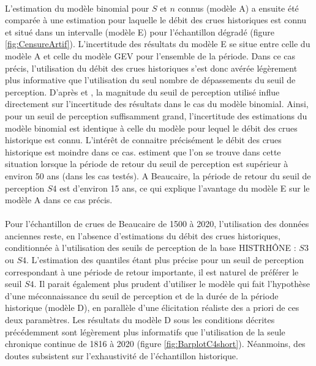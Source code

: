 	\paragraph{} L'estimation du modèle binomial pour $S$ et $n$ connus (modèle A) a ensuite été comparée à une estimation pour laquelle le débit des crues historiques est connu et situé dans un intervalle (modèle E) pour l'échantillon dégradé (figure \ref{fig:CensureArtif}). L'incertitude des résultats du modèle E se situe entre celle du modèle A et celle du modèle GEV pour l'ensemble de la période. Dans ce cas précis, l'utilisation du débit des crues historiques s'est donc avérée légèrement plus informative que l'utilisation du seul nombre de dépassements du seuil de perception. D'après \citet{stedinger_flood_1986} et \citet{payrastre_usefulness_2011}, la magnitude du seuil de perception utilisé influe directement sur l'incertitude des résultats dans le cas du modèle binomial. Ainsi, pour un seuil de perception suffisamment grand, l'incertitude des estimations du modèle binomial est identique à celle du modèle pour lequel le débit des crues historique est connu. L'intérêt de connaitre précisément le débit des crues historique est moindre dans ce cas. \citet{payrastre_usefulness_2011} estiment que l'on se trouve dans cette situation lorsque la période de retour du seuil de perception est supérieur à environ 50 ans (dans les cas testés). A Beaucaire, la période de retour du seuil de perception $S4$ est d'environ 15 ans, ce qui explique l'avantage du modèle E sur le modèle A dans ce cas précis.
	
		\paragraph{} Pour l'échantillon de crues de Beaucaire de 1500 à 2020, l'utilisation des données anciennes reste, en l'absence d'estimations du débit des crues historiques, conditionnée à l'utilisation des seuils de perception de la base HISTRHÔNE : $S3$ ou $S4$. L'estimation des quantiles étant plus précise pour un seuil de perception correspondant à une période de retour importante, il est naturel de préférer le seuil $S4$. Il parait également plus prudent d'utiliser le modèle qui fait l'hypothèse d'une méconnaissance du seuil de perception et de la durée de la période historique (modèle D), en parallèle d'une élicitation réaliste des a priori de ces deux paramètres. Les résultats du modèle D sous les conditions décrites précédemment sont légèrement plus informatifs que l'utilisation de la seule chronique continue de 1816 à 2020 (figure \ref{fig:BarplotC4short}). Néanmoins, des doutes subsistent sur l'exhaustivité de l'échantillon historique. 
	
